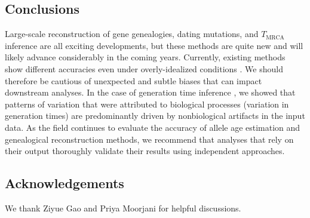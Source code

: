 \documentclass[]{article}
\begin{document}
%
%

\subsection*{Conclusions}

Large-scale reconstruction of gene genealogies, dating mutations, and
$T_\text{MRCA}$ inference are all exciting developments, but these methods are
quite new and will likely advance considerably in the coming years. Currently,
existing methods show different accuracies even under overly-idealized
conditions \citep{brandt2022evaluation}. We should therefore be cautious of
unexpected and subtle biases that can impact downstream analyses. In the case
of generation time inference \citep{wang2023human}, we showed that patterns of
variation that were attributed to biological processes (variation in generation
times) are predominantly driven by nonbiological artifacts in the input data.
As the field continues to evaluate the accuracy of allele age estimation and
genealogical reconstruction methods, we recommend that analyses that rely on
their output thoroughly validate their results using independent approaches.

\subsection*{Acknowledgements}

We thank Ziyue Gao and Priya Moorjani for helpful discussions.



\end{document}
